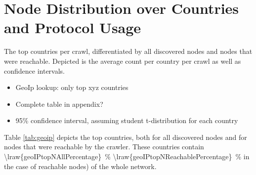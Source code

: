 \documentclass[10pt]{article}
\begin{document}
\section{Node Distribution over Countries and Protocol Usage}
\label{sec:eval_country_distribution}
%
\begin{table}[htb]

\caption{The top  countries per crawl, differentiated by all discovered nodes and nodes that were reachable. Depicted is the average count per country per crawl as well as confidence intervals.}
\label{tab:geoip}
\end{table}
%
\begin{itemize}
  \item GeoIp lookup: only top xyz countries
  \item Complete table in appendix?
  \item 95\% confidence interval, assuming student t-distribution for each country
\end{itemize}
%
Table \ref{tab:geoip} depicts the top  countries, both for all discovered nodes and for nodes that were reachable by the crawler.
These  countries contain \SI{\lraw{geoIPtopNAllPercentage}}{\percent} \SI{\lraw{geoIPtopNReachablePercentage}}{\percent} in the case of reachable nodes) of the whole network.
\end{document}
